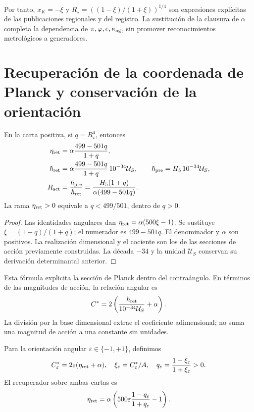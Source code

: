 Por tanto, \(x_K=-\xi\) y \(R_\star=((1-\xi)/(1+\xi))^{1/4}\) son expresiones explícitas de las publicaciones regionales y del registro. La sustitución de la clausura de \(\alpha\) completa la dependencia de \(\pi,\varphi,e,\kappa_{\rm ag}\), sin promover reconocimientos metrológicos a generadores.

\section{Recuperación de la coordenada de Planck y conservación de la orientación}

\begin{theorem}
\label{x_reciprocidad:rec:thm:accion}
En la carta positiva, si \(q=R_\star^4\), entonces
\begin{align}
 \eta_{\rm ret}&=\alpha\frac{499-501q}{1+q},\label{x_reciprocidad:rec:eq:eta-radio}\\
 \hbar_{\rm ret}&=\alpha\frac{499-501q}{1+q}\,10^{-34}\mathcal U_S,
 \qquad\hbar_{\rm pre}=H_5\,10^{-34}\mathcal U_S,\label{x_reciprocidad:rec:eq:planck-radio}\\
 R_{\rm act}&=\frac{\hbar_{\rm pre}}{\hbar_{\rm ret}}
 =\frac{H_5(1+q)}{\alpha(499-501q)}.\label{x_reciprocidad:rec:eq:ratio-radio}
\end{align}
La rama \(\eta_{\rm ret}>0\) equivale a \(q<499/501\), dentro de \(q>0\).
\end{theorem}
\begin{proof}
Las identidades angulares dan \(\eta_{\rm ret}=\alpha(500\xi-1)\). Se sustituye \(\xi=(1-q)/(1+q)\); el numerador es \(499-501q\). El denominador y \(\alpha\) son positivos. La realización dimensional y el cociente son los de las secciones de acción previamente construidas. La década \(-34\) y la unidad \(\mathcal U_S\) conservan su derivación determinantal anterior.
\end{proof}

Esta fórmula explicita la sección de Planck dentro del contraángulo. En términos de las magnitudes de acción, la relación angular es
\[
 C^*=2\left(\frac{\hbar_{\rm ret}}{10^{-34}\mathcal U_S}+\alpha\right).
\]
La división por la base dimensional extrae el coeficiente adimensional; no suma una magnitud de acción a una constante sin unidades.

Para la orientación angular \(\varepsilon\in\{-1,+1\}\), definimos
\[
 C^*_{\varepsilon}=2\varepsilon(\eta_{\rm ret}+\alpha),\quad
 \xi_\varepsilon=C^*_{\varepsilon}/A,\quad
 q_\varepsilon=\frac{1-\xi_\varepsilon}{1+\xi_\varepsilon}>0.
\]
El recuperador sobre ambas cartas es
\begin{equation}
 \eta_{\rm ret}=\alpha\left(500\varepsilon
        \frac{1-q_\varepsilon}{1+q_\varepsilon}-1\right).
 \label{x_reciprocidad:rec:eq:eta-orientada}
\end{equation}

